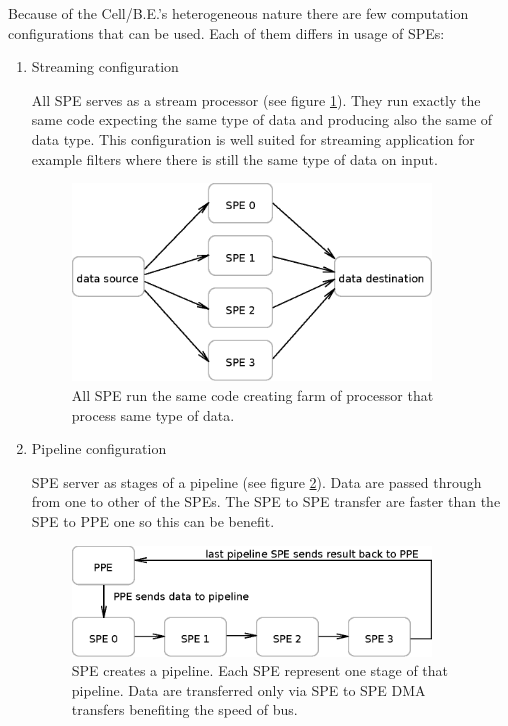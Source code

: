\par
Because of the \mbox{Cell/B.E.}'s heterogeneous nature there are few computation configurations that can be used.
Each of them differs in usage of SPEs:
\begin{enumerate}
\item Streaming configuration
\par
All SPE serves as a stream processor (see figure \ref{fg:streamingModel}).
They run exactly the same code expecting the same type of data and producing also the same of data type.
This configuration is well suited for streaming application for example filters where there is still the same type of data on input.

\begin{figure}
    \centering
    \includegraphics[width=0.9\textwidth]{data/streamingModel}
    \caption[Streaming SPE configuration]{All SPE run the same code creating farm of processor that process same type of data.}
    \label{fg:streamingModel}
\end{figure}

\item Pipeline configuration
\par
SPE server as stages of a pipeline (see figure \ref{fg:pipelineModel}).
Data are passed through from one to other of the SPEs.
The SPE to SPE transfer are faster than the SPE to PPE one so this can be benefit.

\begin{figure}
    \centering
    \includegraphics[width=0.9\textwidth]{data/pipelineModel}
    \caption[Pipeline SPE configuration]{SPE creates a pipeline. Each SPE represent one stage of that pipeline. Data are transferred only via SPE to SPE DMA transfers benefiting the speed of bus.}
    \label{fg:pipelineModel}
\end{figure}


\end{enumerate}
